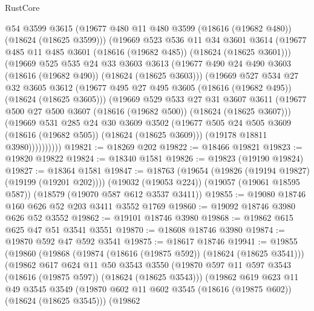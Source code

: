 \begin{lexlean}{RustCore}
\begin{coremodule}
            @54
            @3599
            @3615
            (@19677 @480 @11 @480 @3599 (@18616 (@19682 @480)) (@18624 (@18625 @3599)))
            (@19669
              @523
              @536
              @11
              @34
              @3601
              @3614
              (@19677 @485 @11 @485 @3601 (@18616 (@19682 @485)) (@18624 (@18625 @3601)))
              (@19669
                @525
                @535
                @24
                @33
                @3603
                @3613
                (@19677 @490 @24 @490 @3603 (@18616 (@19682 @490)) (@18624 (@18625 @3603)))
                (@19669
                  @527
                  @534
                  @27
                  @32
                  @3605
                  @3612
                  (@19677 @495 @27 @495 @3605 (@18616 (@19682 @495)) (@18624 (@18625 @3605)))
                  (@19669
                    @529
                    @533
                    @27
                    @31
                    @3607
                    @3611
                    (@19677 @500 @27 @500 @3607 (@18616 (@19682 @500)) (@18624 (@18625 @3607)))
                    (@19669
                      @531
                      @285
                      @24
                      @30
                      @3609
                      @3502
                      (@19677 @505 @24 @505 @3609 (@18616 (@19682 @505)) (@18624 (@18625 @3609)))
                      (@19178 @18811 @3980))))))))))
@19821 := @18269 @202
@19822 := @18466 @19821
@19823 := @19820 @19822
@19824 := @18340 @1581
@19826 := @19823 (@19190 @19824)
@19827 := @18364 @1581
@19847 := @18763
    (@19654 (@19826 (@19194 @19827) (@19199 (@19201 @202))))
    (@19032 (@19053 @224))
    (@19057 (@19061 @18595 @587))
    (@18579 (@19070 @587 @612 @3537 @3411))
@19855 := @19080 @18746 @160 @626 @52 @203 @3411 @3552 @1769
@19860 := @19092 @18746 @3980 @626 @52 @3552
@19862 := @19101 @18746 @3980
@19868 := @19862 @615 @625 @47 @51 @3541 @3551
@19870 := @18608 @18746 @3980
@19874 := @19870 @592 @47 @592 @3541
@19875 := @18617 @18746
@19941 := @19855
    (@19860
      (@19868
        (@19874 (@18616 (@19875 @592)) (@18624 (@18625 @3541)))
        (@19862
          @617
          @624
          @11
          @50
          @3543
          @3550
          (@19870 @597 @11 @597 @3543 (@18616 (@19875 @597)) (@18624 (@18625 @3543)))
          (@19862
            @619
            @623
            @11
            @49
            @3545
            @3549
            (@19870 @602 @11 @602 @3545 (@18616 (@19875 @602)) (@18624 (@18625 @3545)))
            (@19862

\end{coremodule}
\end{lexlean}
